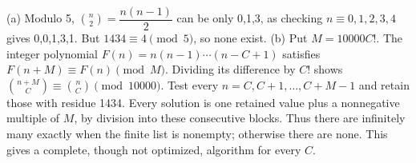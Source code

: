 (a) Modulo 5, $\binom n2=\dfrac{n(n-1)}{2}$ can be only 0,1,3, as checking $n\equiv0,1,2,3,4$ gives 0,0,1,3,1. But $1434\equiv4\pmod5$, so $\boxed{\text{none}}$ exist. (b) Put $M=10000C!$. The integer polynomial $F(n)=n(n-1)\cdots(n-C+1)$ satisfies $F(n+M)\equiv F(n)\pmod M$. Dividing its difference by $C!$ shows $\binom{n+M}{C}\equiv\binom nC\pmod{10000}$. Test every $n=C,C+1,\ldots,C+M-1$ and retain those with residue 1434. Every solution is one retained value plus a nonnegative multiple of $M$, by division into these consecutive blocks. Thus there are infinitely many exactly when the finite list is nonempty; otherwise there are none. This gives a complete, though not optimized, algorithm for every $C$.
